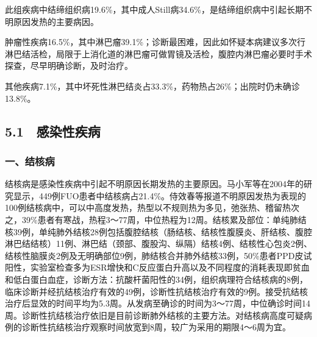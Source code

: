 此组疾病中结缔组织病19.6\%，其中成人Still病34.6\%，是结缔组织病中引起长期不明原因发热的主要病因。

肿瘤性疾病16.5\%，其中淋巴瘤39.1\%；诊断最困难，因此如怀疑本病建议多次行淋巴结活检，局限于上消化道的淋巴瘤可做胃镜及活检，腹腔内淋巴瘤必要时手术探查，尽早明确诊断，及时治疗。

其他疾病7.1\%，其中坏死性淋巴结炎占33.3\%，药物热占26\%；出院时仍未确诊13.8\%。

\protect\hypertarget{text00033.html}{}{}

\subsection{5.1　感染性疾病}

\subsubsection{一、结核病}

结核病是感染性疾病中引起不明原因长期发热的主要原因。马小军等在2004年的研究显示，449例FUO患者中结核病占21.4\%。侍效春等报道不明原因发热为表现的100例结核病中，可以中高度发热，热型以不规则热为多见，弛张热、稽留热次之，39\%患者有寒战，热程3～77周，中位热程为12周。结核累及部位：单纯肺结核39例，单纯肺外结核28例包括腹腔结核（肠结核、结核性腹膜炎、肝结核、腹腔淋巴结结核）11例、淋巴结（颈部、腹股沟、纵隔）结核4例、结核性心包炎2例、结核性脑膜炎2例及无明确部位9例，肺结核合并肺外结核33例，50\%患者PPD皮试阳性，实验室检查多为ESR增快和C反应蛋白升高以及不同程度的消耗表现即贫血和低白蛋白血症，诊断方法：抗酸杆菌阳性的34例，组织病理符合结核病的8例，临床诊断并经抗结核治疗有效的49例，诊断性抗结核治疗有效的9例。接受抗结核治疗后显效的时间平均为5.3周。从发病至确诊的时间为3～77周，中位确诊时间14周。诊断性抗结核治疗依旧是目前诊断肺外结核的主要方法。对结核病高度可疑病例的诊断性抗结核治疗观察时间放宽到8周，较广为采用的期限4～6周为宜。

